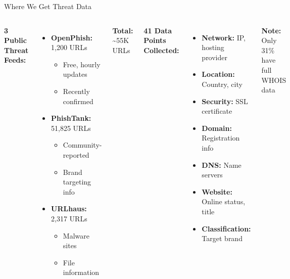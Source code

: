 \documentclass[aspectratio=169]{beamer}
\begin{document}
\begin{frame}{Where We Get Threat Data}
\small
\begin{columns}[T]
\textbf{3 Public Threat Feeds:}
\begin{itemize}
    \item \textbf{OpenPhish:} 1,200 URLs
    \begin{itemize}
        \item \scriptsize Free, hourly updates
        \item \scriptsize Recently confirmed
    \end{itemize}
    \item \textbf{PhishTank:} 51,825 URLs
    \begin{itemize}
        \item \scriptsize Community-reported
        \item \scriptsize Brand targeting info
    \end{itemize}
    \item \textbf{URLhaus:} 2,317 URLs
    \begin{itemize}
        \scriptsize \item Malware sites
        \scriptsize \item File information
    \end{itemize}
\end{itemize}

\vspace{0.2cm}
\textbf{Total:} \textasciitilde55K URLs

\textbf{41 Data Points Collected:}
\begin{itemize}
    \item \textbf{Network:} IP, hosting provider
    \item \textbf{Location:} Country, city
    \item \textbf{Security:} SSL certificate
    \item \textbf{Domain:} Registration info
    \item \textbf{DNS:} Name servers
    \item \textbf{Website:} Online status, title
    \item \textbf{Classification:} Target brand
\end{itemize}

\vspace{0.2cm}
\scriptsize
\textbf{Note:} Only 31\% have full WHOIS data
\end{columns}
\end{frame}
\end{document}
